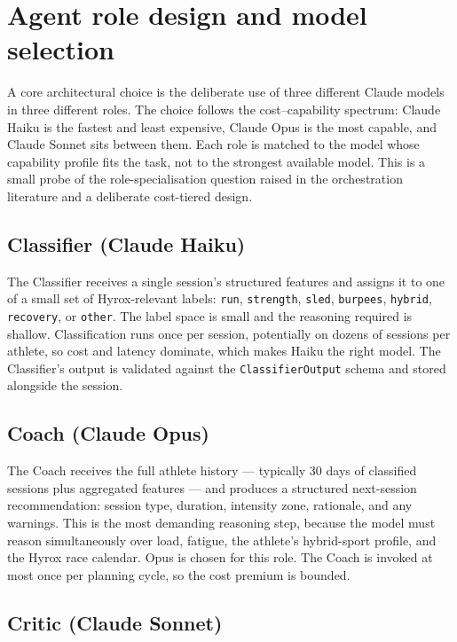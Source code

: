 \section{Agent role design and model selection}

A core architectural choice is the deliberate use of three different Claude models in three different roles. The choice follows the cost--capability spectrum: Claude Haiku is the fastest and least expensive, Claude Opus is the most capable, and Claude Sonnet sits between them. Each role is matched to the model whose capability profile fits the task, not to the strongest available model. This is a small probe of the role-specialisation question raised in the orchestration literature and a deliberate cost-tiered design.

\subsection{Classifier (Claude Haiku)}

The Classifier receives a single session's structured features and assigns it to one of a small set of Hyrox-relevant labels: \texttt{run}, \texttt{strength}, \texttt{sled}, \texttt{burpees}, \texttt{hybrid}, \texttt{recovery}, or \texttt{other}. The label space is small and the reasoning required is shallow. Classification runs once per session, potentially on dozens of sessions per athlete, so cost and latency dominate, which makes Haiku the right model. The Classifier's output is validated against the \texttt{ClassifierOutput} schema and stored alongside the session.

\subsection{Coach (Claude Opus)}

The Coach receives the full athlete history --- typically 30 days of classified sessions plus aggregated features --- and produces a structured next-session recommendation: session type, duration, intensity zone, rationale, and any warnings. This is the most demanding reasoning step, because the model must reason simultaneously over load, fatigue, the athlete's hybrid-sport profile, and the Hyrox race calendar. Opus is chosen for this role. The Coach is invoked at most once per planning cycle, so the cost premium is bounded.

\subsection{Critic (Claude Sonnet)}


